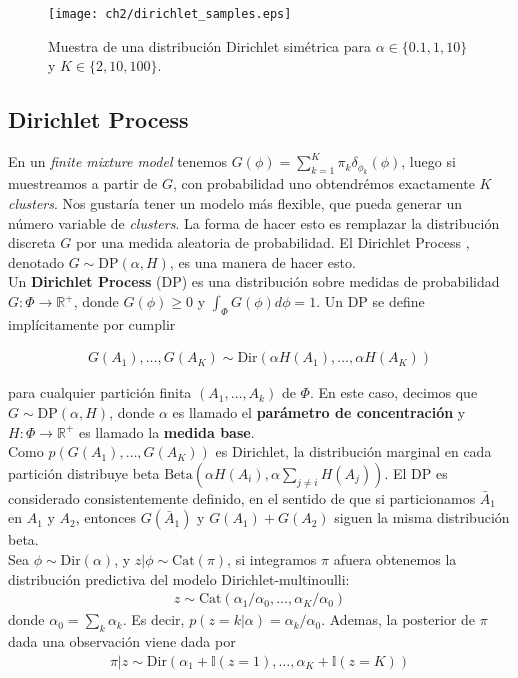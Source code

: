 \documentclass[letterpaper,12pt,oneside]{book} %
\begin{document}
\begin{figure}
    \centering
    \texttt{[image: ch2/dirichlet\_samples.eps]}
    \caption{Muestra de una distribución Dirichlet simétrica para $\alpha \in \{0.1, 1, 10\}$ y $K\in\{2, 10, 100\}$.}
    \label{img:dirichlet_samples}
\end{figure}

\subsection{Dirichlet Process}
\label{sec:dp}

En un \textit{finite mixture model} tenemos $G(\phi) = \sum_{k=1}^{K} \pi_{k}\delta_{\phi_{k}}(\phi)$, luego si muestreamos a partir de $G$, con probabilidad uno obtendrémos exactamente $K$ \textit{clusters}. Nos gustaría tener un modelo más flexible, que pueda generar un número variable de \textit{clusters}. La forma de hacer esto es remplazar la distribución discreta $G$ por una medida aleatoria de probabilidad. El Dirichlet Process \citep{ferguson1973bayesian}, denotado $G\sim \text{DP}(\alpha, H)$, es una manera de hacer esto.\\

Un \textbf{Dirichlet Process} (DP) es una distribución sobre medidas de probabilidad $G: \Phi \rightarrow \mathbb{R}^{+}$, donde $G(\phi)\geq 0$ y $\int_{\Phi}G(\phi)d\phi=1$. Un DP se define implícitamente por cumplir 

\begin{align}
    G(A_{1}), \ldots, G(A_{K}) \sim \text{Dir}(\alpha H(A_{1}), \ldots, \alpha H(A_{K}))
\end{align}

para cualquier partición finita $(A_{1}, \ldots, A_{k})$ de $\Phi$. En este caso, decimos que $G\sim \text{DP}(\alpha, H)$, donde $\alpha$ es llamado el \textbf{parámetro de concentración} y $H: \Phi \rightarrow \mathbb{R}^{+}$ es llamado la \textbf{medida base}.\\

Como $p(G(A_{1}), \ldots, G(A_{K}))$ es Dirichlet, la distribución marginal en cada partición distribuye beta $\text{Beta}(\alpha H(A_{i}), \alpha \sum_{j\neq i}H(A_{j}))$. El DP es considerado consistentemente definido, en el sentido de que si particionamos $\bar{A}_{1}$ en $A_{1}$ y $A_{2}$, entonces $G(\bar{A}_{1})$ y $G(A_{1})+G(A_{2})$ siguen la misma distribución beta. \\

Sea $\phi \sim \text{Dir}(\alpha)$, y $z|\phi  \sim \text{Cat}(\pi)$, si integramos $\pi$ afuera obtenemos la distribución predictiva del modelo Dirichlet-multinoulli:
\begin{align}
    z\sim \text{Cat}(\alpha_{1}/\alpha_{0}, \ldots, \alpha_{K}/\alpha_{0})
\end{align}
donde $\alpha_{0} = \sum_{k}\alpha_{k}$. Es decir, $p(z=k|\alpha)=\alpha_{k}/\alpha_{0}$. Ademas, la posterior de $\pi$ dada una observación viene dada por
\begin{align}
    \pi|z \sim \text{Dir}(\alpha_{1}+\mathbb{I}(z=1), \ldots, \alpha_{K}+\mathbb{I}(z=K))
\end{align}
\end{document}

